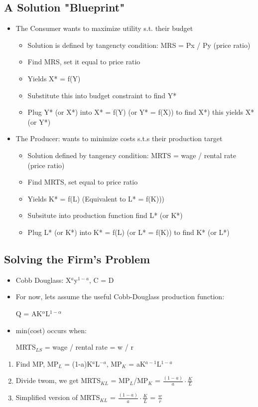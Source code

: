 \documentclass{article}
\begin{document}
\subsection{A Solution "Blueprint"}
\begin{itemize}
  \item The Consumer wants to maximize utility s.t. their budget
    \begin{itemize}
      \item Solution is defined by tangencty condition: MRS = Px / Py (price ratio)
      \item Find MRS, set it equal to price ratio
      \item Yields X* = f(Y)
      \item Substitute this into budget constraint to find Y*
      \item Plug Y* (or X*) into X* = f(Y) (or Y* = f(X)) to find X*) this yields X* (or Y*)
    \end{itemize}
  \item The Producer: wants to minimize costs s.t.s their production target
    \begin{itemize}
      \item Solution defined by tangency condition: MRTS = wage / rental rate (price ratio)
      \item Find MRTS, set equal to price ratio
      \item Yields K* = f(L) (Equivalent to L* = f(K)))
      \item Subsitute into production function \Rightarrow{} find L* (or K*)
      \item Plug L* (or K*) into K* = f(L) (or L* = f(K)) to find K* (or L*)
    \end{itemize}
\end{itemize}

\subsection{Solving the Firm's Problem}
\begin{itemize}
  \item Cobb Douglass: X$^a$y$^{1-a}$, C = D
  \item For now, lets assume the useful Cobb-Douglass production function:

    Q = AK$^{\alpha}$L$^{1-\alpha}$
  \item min(cost) occurs when:

    MRTS$_{LS}$ = wage / rental rate = w / r
\end{itemize}
\begin{enumerate}
  \item Find MP, MP$_L$ = (1-a)K$^a$L$^{-a}$, MP$_K$ = aK$^{a-1}$L$^{1-a}$
  \item Divide twom, we get MRTS$_{KL}$ = MP$_L$/MP$_K$ = $\frac{(1-a)}{a} \cdot \frac{K}{L}$
  \item Simplified version of MRTS$_{KL}$ = $\frac{(1-a)}{a} \cdot \frac{K}{L}$ = $\frac{w}{r}$
\end{enumerate}
\end{document}
